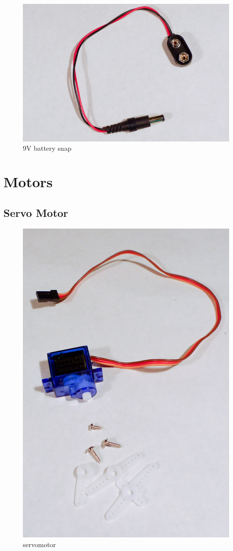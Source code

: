 \begin{figure}[!htb]
     \centering
     \includegraphics[scale=0.3]{img/components/battery_snap.jpg}
     \caption{9V battery snap}
     \label{9V battery snap}
\end{figure}

\section{Motors}

\subsection{Servo Motor}

\begin{figure}[!htb]
     \centering
     \includegraphics[scale=0.3]{img/components/servomotor.jpg}
     \caption{servomotor}
     \label{servomotor}
\end{figure}


